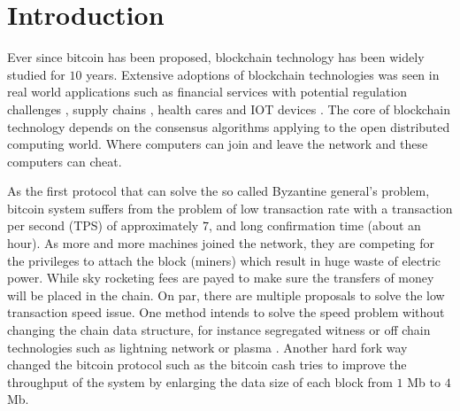 \section{Introduction}
Ever since bitcoin \cite{nakamoto2008bitcoin} has been proposed, blockchain technology has been widely studied for $10$ years. 
Extensive adoptions of blockchain technologies was seen in real world applications such as 
financial services with potential regulation challenges \cite{michael2018blockchain, tapscott2017blockchain}, 
supply chains \cite{korpela2017digital,tian2016agri, abeyratne2016blockchain}, 
health cares \cite{azaria2016medrec,yue2016healthcare} and IOT devices \cite{christidis2016blockchains}.
The core of blockchain technology depends on the consensus algorithms applying to the open distributed computing world.
Where computers can join and leave the network and these computers can cheat.

As the first protocol that can solve the so called Byzantine general's problem, 
bitcoin system suffers from the problem of low transaction rate with a transaction per second (TPS) of approximately $7$, and long confirmation time (about an hour).
As more and more machines joined the network, they are competing for the privileges to attach the block (miners) which result in huge waste of electric power.
While sky rocketing fees are payed to make sure the transfers of money will be placed in the chain.
On par, there are multiple proposals to solve the low transaction speed issue. 
One method intends to solve the speed problem without changing the chain data structure, for instance segregated witness \cite{lombrozo2015segregated} or off chain technologies such as lightning network \cite{poon2016bitcoin} or plasma \cite{poon2017plasma}. Another hard fork way changed the bitcoin protocol such as the bitcoin cash tries to improve the throughput of the system by enlarging the data size of each block from $1$ Mb to $4$ Mb. 

